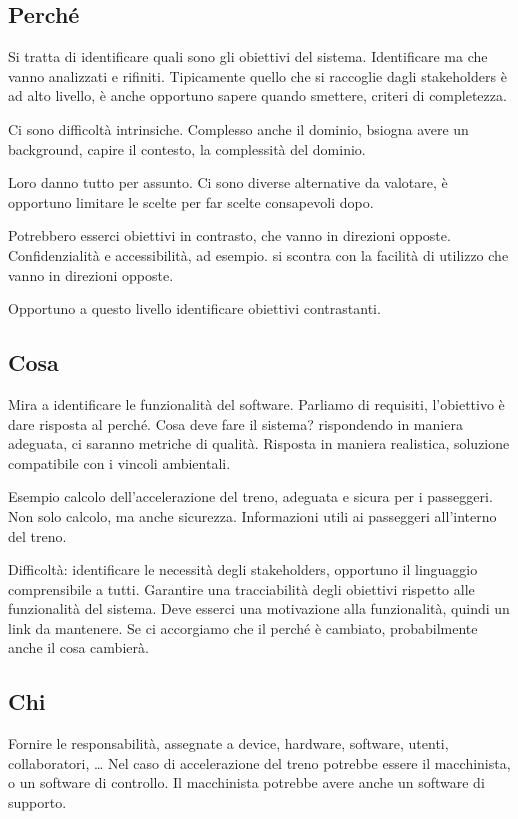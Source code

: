 \documentclass[oneside,a4paper,11pt]{book}
\theoremstyle{italicstyle}
\theoremstyle{normStyle}
\begin{document}
\subsection{Perché}
Si tratta di identificare quali sono gli obiettivi del sistema.
Identificare ma che vanno analizzati e rifiniti. Tipicamente quello 
che si raccoglie dagli stakeholders è ad alto livello, è anche opportuno 
sapere quando smettere, criteri di completezza.

Ci sono difficoltà intrinsiche. Complesso anche il dominio, bsiogna avere 
un background, capire il contesto, la complessità del dominio.

Loro danno tutto per assunto. Ci sono diverse alternative da valotare, è opportuno 
limitare le scelte per far scelte consapevoli dopo.

Potrebbero esserci obiettivi in contrasto, che vanno in direzioni opposte.
Confidenzialità e accessibilità, ad esempio. si scontra con la facilità di utilizzo 
che vanno in direzioni opposte.

Opportuno a questo livello identificare obiettivi contrastanti.

\subsection{Cosa}
Mira a identificare le funzionalità del software. Parliamo di requisiti,
l'obiettivo è dare risposta al perché. Cosa deve fare il sistema? rispondendo in 
maniera adeguata, ci saranno metriche di qualità.
Risposta in maniera realistica, soluzione compatibile con i vincoli ambientali.

Esempio calcolo dell'accelerazione del treno, adeguata e sicura per 
i passeggeri. Non solo calcolo, ma anche sicurezza. Informazioni utili 
ai passeggeri all'interno del treno.

Difficoltà: identificare le necessità degli stakeholders, opportuno 
il linguaggio comprensibile a tutti. Garantire una tracciabilità degli obiettivi 
rispetto alle funzionalità del sistema. Deve esserci una motivazione 
alla funzionalità, quindi un link da mantenere. Se ci accorgiamo che
il perché è cambiato, probabilmente anche il cosa cambierà.

\subsection{Chi}
Fornire le responsabilità, assegnate a device, hardware, software,
utenti, collaboratori, \dots
Nel caso di accelerazione del treno potrebbe essere il macchinista,
o un software di controllo. Il macchinista potrebbe avere anche un software
di supporto.
\end{document}
